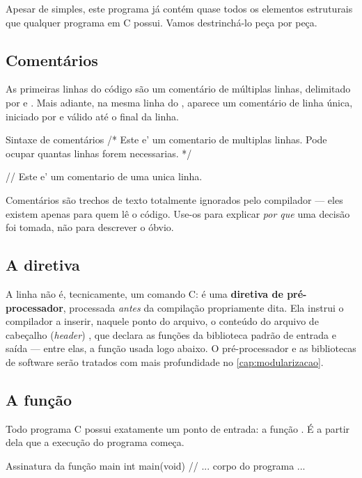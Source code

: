 Apesar de simples, este programa já contém quase todos os elementos estruturais que qualquer programa em C possui. Vamos destrinchá-lo peça por peça.

\subsection{Comentários}

As primeiras linhas do código são um comentário de múltiplas linhas, delimitado por \code{/*} e \code{*/}. Mais adiante, na mesma linha do , aparece um comentário de linha única, iniciado por \code{//} e válido até o final da linha.

\begin{codigoc}{Sintaxe de comentários}
/*
    Este e' um comentario de multiplas linhas.
    Pode ocupar quantas linhas forem necessarias.
*/

// Este e' um comentario de uma unica linha.
\end{codigoc}

Comentários são trechos de texto totalmente ignorados pelo compilador — eles existem apenas para quem lê o código. Use-os para explicar \emph{por que} uma decisão foi tomada, não para descrever o óbvio.

\subsection{A diretiva }

A linha  não é, tecnicamente, um comando C: é uma \textbf{diretiva de pré-processador}, processada \emph{antes} da compilação propriamente dita. Ela instrui o compilador a inserir, naquele ponto do arquivo, o conteúdo do arquivo de cabeçalho (\emph{header}) , que declara as funções da biblioteca padrão de entrada e saída — entre elas, a função  usada logo abaixo. O pré-processador e as bibliotecas de software serão tratados com mais profundidade no \cref{cap:modularizacao}.

\subsection{A função }

Todo programa C possui exatamente um ponto de entrada: a função . É a partir dela que a execução do programa começa.

\begin{codigoc}{Assinatura da função main}
int main(void) {
    // ... corpo do programa ...
}
\end{codigoc}

